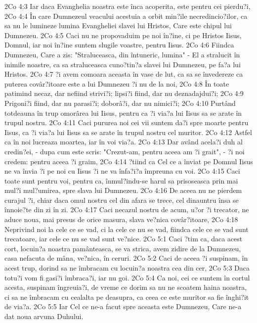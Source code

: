 2Co 4:3  Iar daca Evanghelia noastra este înca acoperita, este pentru cei pierdu?i,
2Co 4:4  În care Dumnezeul veacului acestuia a orbit min?ile necredincio?ilor, ca sa nu le lumineze lumina Evangheliei slavei lui Hristos, Care este chipul lui Dumnezeu.
2Co 4:5  Caci nu ne propovaduim pe noi în?ine, ci pe Hristos Iisus, Domnul, iar noi în?ine suntem slugile voastre, pentru Iisus.
2Co 4:6  Fiindca Dumnezeu, Care a zis: "Straluceasca, din întuneric, lumina" - El a stralucit în inimile noastre, ca sa straluceasca cuno?tin?a slavei lui Dumnezeu, pe fa?a lui Hristos.
2Co 4:7  ?i avem comoara aceasta în vase de lut, ca sa se învedereze ca puterea covâr?itoare este a lui Dumnezeu ?i nu de la noi,
2Co 4:8  În toate patimind necaz, dar nefiind strivi?i; lipsi?i fiind, dar nu deznadajdui?i;
2Co 4:9  Prigoni?i fiind, dar nu parasi?i; doborâ?i, dar nu nimici?i;
2Co 4:10  Purtând totdeauna în trup omorârea lui Iisus, pentru ca ?i via?a lui Iisus sa se arate în trupul nostru.
2Co 4:11  Caci pururea noi cei vii suntem da?i spre moarte pentru Iisus, ca ?i via?a lui Iisus sa se arate în trupul nostru cel muritor.
2Co 4:12  Astfel ca în noi lucreaza moartea, iar în voi via?a.
2Co 4:13  Dar având acela?i duh al credin?ei, - dupa cum este scris: "Crezut-am, pentru aceea am ?i grait", - ?i noi credem: pentru aceea ?i graim,
2Co 4:14  ?tiind ca Cel ce a înviat pe Domnul Iisus ne va învia ?i pe noi cu Iisus ?i ne va înfa?i?a împreuna cu voi.
2Co 4:15  Caci toate sunt pentru voi, pentru ca, înmul?indu-se harul sa prisoseasca prin mai mul?i mul?umirea, spre slava lui Dumnezeu.
2Co 4:16  De aceea nu ne pierdem curajul ?i, chiar daca omul nostru cel din afara se trece, cel dinauntru însa se înnoie?te din zi în zi.
2Co 4:17  Caci necazul nostru de acum, u?or ?i trecator, ne aduce noua, mai presus de orice masura, slava ve?nica covâr?itoare,
2Co 4:18  Neprivind noi la cele ce se vad, ci la cele ce nu se vad, fiindca cele ce se vad sunt trecatoare, iar cele ce nu se vad sunt ve?nice.
2Co 5:1  Caci ?tim ca, daca acest cort, locuin?a noastra pamânteasca, se va strica, avem zidire de la Dumnezeu, casa nefacuta de mâna, ve?nica, în ceruri.
2Co 5:2  Caci de aceea ?i suspinam, în acest trup, dorind sa ne îmbracam cu locuin?a noastra cea din cer,
2Co 5:3  Daca totu?i vom fi gasi?i îmbraca?i, iar nu goi.
2Co 5:4  Ca noi, cei ce suntem în cortul acesta, suspinam îngreuia?i, de vreme ce dorim sa nu ne scoatem haina noastra, ci sa ne îmbracam cu cealalta pe deasupra, ca ceea ce este muritor sa fie înghi?it de via?a.
2Co 5:5  Iar Cel ce ne-a facut spre aceasta este Dumnezeu, Care ne-a dat noua arvuna Duhului.
